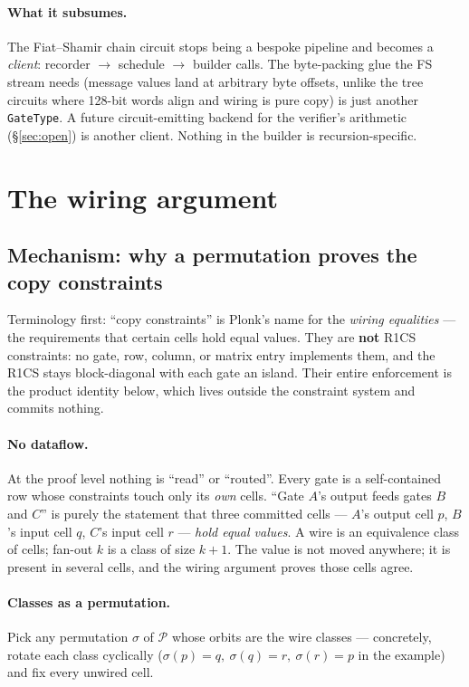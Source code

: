 \documentclass[11pt]{article}
\newcommand{\code}[1]{\texttt{#1}}
\newcommand{\cells}{\mathcal{P}}
\theoremstyle{definition}
\begin{document}
\paragraph{What it subsumes.} The Fiat--Shamir chain circuit stops being a
bespoke pipeline and becomes a \emph{client}: recorder $\to$ schedule $\to$
builder calls. The byte-packing glue the FS stream needs (message values land
at arbitrary byte offsets, unlike the tree circuits where 128-bit words align
and wiring is pure copy) is just another \code{GateType}. A future
circuit-emitting backend for the verifier's arithmetic (\S\ref{sec:open}) is
another client. Nothing in the builder is recursion-specific.

\section{The wiring argument}\label{sec:wiring}

\subsection{Mechanism: why a permutation proves the copy
constraints}\label{sec:wiring-mech}

Terminology first: ``copy constraints'' is Plonk's name for the
\emph{wiring equalities} --- the requirements that certain cells hold
equal values. They are \textbf{not} R1CS constraints: no gate, row,
column, or matrix entry implements them, and the R1CS stays
block-diagonal with each gate an island. Their entire enforcement is the
product identity below, which lives outside the constraint system and
commits nothing.

\paragraph{No dataflow.} At the proof level nothing is ``read'' or
``routed''. Every gate is a self-contained row whose constraints touch
only its \emph{own} cells. ``Gate $A$'s output feeds gates $B$ and $C$''
is purely the statement that three committed cells --- $A$'s output cell
$p$, $B$'s input cell $q$, $C$'s input cell $r$ --- \emph{hold equal
values}. A wire is an equivalence class of cells; fan-out $k$ is a class
of size $k{+}1$. The value is not moved anywhere; it is present in
several cells, and the wiring argument proves those cells agree.

\paragraph{Classes as a permutation.} Pick any permutation $\sigma$ of
$\cells$ whose orbits are the wire classes --- concretely, rotate each
class cyclically ($\sigma(p) = q,\ \sigma(q) = r,\ \sigma(r) = p$ in the
example) and fix every unwired cell.
\end{document}
